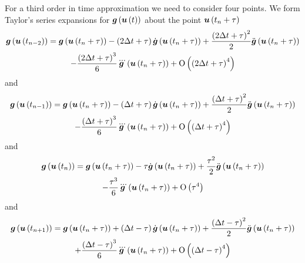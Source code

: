 For a third order in time approximation we need to consider four points. We
form Taylor's series expansions for $ \boldsymbol{g}\left(  \boldsymbol{u}\left( t \right)  \right) $
about the point $ \boldsymbol{u}\left( t_{n}+\tau \right) $ \ie
\begin{multline}
  \fnof{\vectr{g}}{\fnof{\vectr{u}}{t_{n-2}}}=\fnof{\vectr{g}}{\fnof{\vectr{u}}{t_{n}+\tau}}
  - \pbrac{2\Delta t+\tau}\fnof{\dot{\vectr{g}}}{\fnof{\vectr{u}}{t_{n}+\tau}} 
  + \dfrac{\pbrac{2\Delta t+\tau}^{2}}{2}\fnof{\ddot{\vectr{g}}}{\fnof{\vectr{u}}{t_{n}+\tau}} \\
  - \dfrac{\pbrac{2\Delta t+\tau}^{3}}{6}\fnof{\dddot{\vectr{g}}}{\fnof{\vectr{u}}{t_{n}+\tau}}
  + \orderof{\pbrac{2\Delta t+\tau}^{4}}
  \label{eqn:thirdorderpreviouspreviousTaylorexpansion}
\end{multline}
and
\begin{multline}
  \fnof{\vectr{g}}{\fnof{\vectr{u}}{t_{n-1}}}=\fnof{\vectr{g}}{\fnof{\vectr{u}}{t_{n}+\tau}}
  - \pbrac{\Delta t+\tau}\fnof{\dot{\vectr{g}}}{\fnof{\vectr{u}}{t_{n}+\tau}} 
  + \dfrac{\pbrac{\Delta t+\tau}^{2}}{2}\fnof{\ddot{\vectr{g}}}{\fnof{\vectr{u}}{t_{n}+\tau}} \\
  - \dfrac{\pbrac{\Delta t+\tau}^{3}}{6}\fnof{\dddot{\vectr{g}}}{\fnof{\vectr{u}}{t_{n}+\tau}}
  + \orderof{\pbrac{\Delta t+\tau}^{4}}
  \label{eqn:thirdorderpreviousTaylorexpansion}
\end{multline}
and
\begin{multline}
  \fnof{\vectr{g}}{\fnof{\vectr{u}}{t_{n}}}=\fnof{\vectr{g}}{\fnof{\vectr{u}}{t_{n}+\tau}}
  - \tau\fnof{\dot{\vectr{g}}}{\fnof{\vectr{u}}{t_{n}+\tau}}
  + \dfrac{\tau^{2}}{2}\fnof{\ddot{\vectr{g}}}{\fnof{\vectr{u}}{t_{n}+\tau}} \\
  - \dfrac{\tau^{3}}{6}\fnof{\dddot{\vectr{g}}}{\fnof{\vectr{u}}{t_{n}+\tau}}
  + \orderof{\tau^{4}}
  \label{eqn:thirdordercurrentTaylorexpansion}
\end{multline}
and
\begin{multline}
  \fnof{\vectr{g}}{\fnof{\vectr{u}}{t_{n+1}}}=\fnof{\vectr{g}}{\fnof{\vectr{u}}{t_{n}+\tau}}
  + \pbrac{\Delta t-\tau}\fnof{\dot{\vectr{g}}}{\fnof{\vectr{u}}{t_{n}+\tau}} 
  + \dfrac{\pbrac{\Delta t-\tau}^{2}}{2}\fnof{\ddot{\vectr{g}}}{\fnof{\vectr{u}}{t_{n}+\tau}} \\
  + \dfrac{\pbrac{\Delta t-\tau}^{3}}{6}\fnof{\dddot{\vectr{g}}}{\fnof{\vectr{u}}{t_{n}+\tau}}
  + \orderof{\pbrac{\Delta t-\tau}^{4}}
  \label{eqn:thirdordernextTaylorexpansion}
\end{multline}

